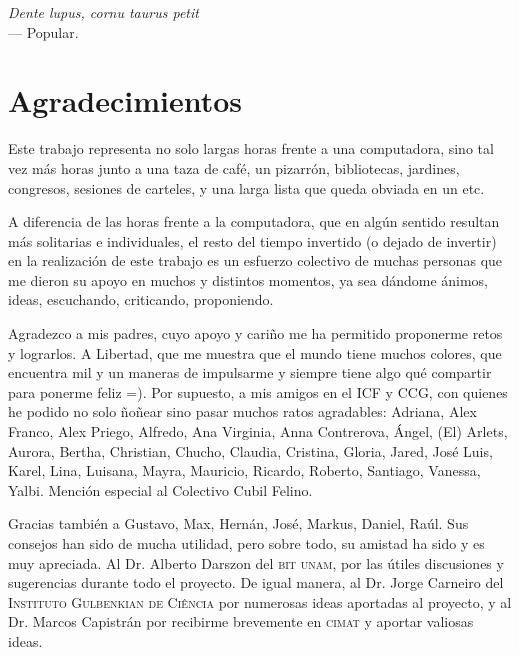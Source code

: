 
\begin{flushright}{\slshape
	Dente lupus, cornu taurus petit}\\
\medskip
    --- Popular.
\end{flushright}

\bigskip

\begingroup
\let\clearpage\relax
\let\cleardoublepage\relax
\let\cleardoublepage\relax
\chapter*{Agradecimientos}
Este trabajo representa no solo largas horas frente a una computadora, sino tal vez más horas junto a una taza de café, un pizarrón, bibliotecas, jardines, congresos, sesiones de carteles, y una larga lista que queda obviada en un etc.

A diferencia de las horas frente a la computadora, que en algún sentido resultan más solitarias e individuales, el resto del tiempo invertido (o dejado de invertir) en la realización de este trabajo es un esfuerzo colectivo de muchas personas que me dieron su apoyo en muchos y distintos momentos, ya sea dándome ánimos, ideas, escuchando, criticando, proponiendo.

Agradezco a mis padres, cuyo apoyo y cariño me ha permitido proponerme retos y lograrlos. A Libertad, que me muestra que el mundo tiene muchos colores, que encuentra mil y un maneras de impulsarme y siempre tiene algo qué compartir para ponerme feliz =). 
Por supuesto, a mis amigos en el ICF y CCG, con quienes he podido no solo ñoñear sino pasar muchos ratos agradables: Adriana, Alex Franco, Alex Priego, Alfredo, Ana Virginia, Anna Contrerova, Ángel, (El) Arlets, Aurora, Bertha, Christian, Chucho, Claudia, Cristina, Gloria, Jared, José Luis, Karel, Lina, Luisana, Mayra, Mauricio, Ricardo, Roberto, Santiago, Vanessa, Yalbi. Mención especial al Colectivo Cubil Felino.

Gracias también a Gustavo, Max, Hernán, José, Markus, Daniel, Raúl. Sus consejos han sido de mucha utilidad, pero sobre todo, su amistad ha sido y es muy apreciada. Al Dr. Alberto Darszon del \textsc{bit unam}, por las útiles discusiones y sugerencias durante todo el proyecto. De igual manera, al Dr. Jorge Carneiro del \textsc{Instituto Gulbenkian de Ciência} por numerosas ideas aportadas al proyecto, y al Dr. Marcos Capistrán por recibirme brevemente en \textsc{cimat} y aportar valiosas ideas.

